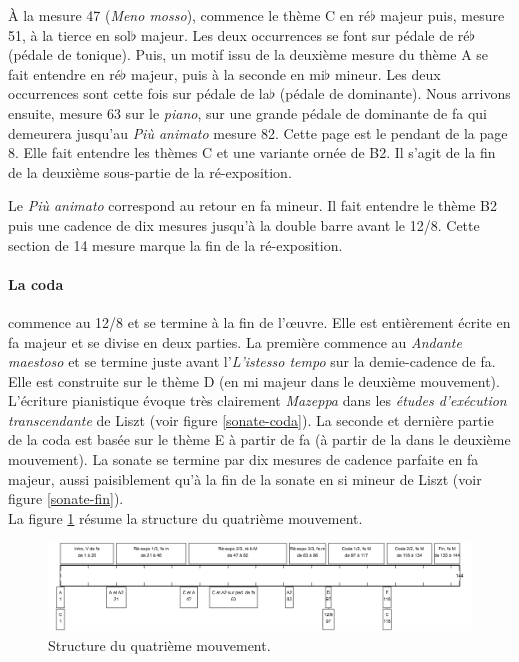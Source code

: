À la mesure 47 (\emph{Meno mosso}), commence le thème C en ré$\flat$ majeur puis, mesure 51, à la tierce en sol$\flat$ majeur. Les deux occurrences se font sur pédale de ré$\flat$ (pédale de tonique). Puis, un motif issu de la deuxième mesure du thème A se fait entendre en ré$\flat$ majeur, puis à la seconde en mi$\flat$ mineur. Les deux occurrences sont cette fois sur pédale de la$\flat$ (pédale de dominante). Nous arrivons ensuite, mesure 63 sur le \emph{piano}, sur une grande pédale de dominante de fa qui demeurera jusqu'au \emph{Più animato} mesure 82. Cette page est le pendant de la page 8. Elle fait entendre les thèmes C et une variante ornée de B2. Il s'agit de la fin de la deuxième sous-partie de la ré-exposition.

Le \emph{Più animato} correspond au retour en fa mineur. Il fait entendre le thème B2 puis une cadence de dix mesures jusqu'à la double barre avant le 12/8. Cette section de 14 mesure marque la fin de la ré-exposition.

\newpage

\paragraph{La coda} commence au 12/8 et se termine à la fin de l'œuvre. Elle est entièrement écrite en fa majeur et se divise en deux parties. La première commence au \emph{Andante maestoso} et se termine juste avant l'\emph{L'istesso tempo} sur la demie-cadence de fa. Elle est construite sur le thème D (en mi majeur dans le deuxième mouvement). L'écriture pianistique évoque très clairement \emph{Mazeppa} dans les \emph{études d'exécution transcendante} de Liszt (voir figure \ref{sonate-coda}). La seconde et dernière partie de la coda est basée sur le thème E à partir de fa (à partir de la dans le deuxième mouvement). La sonate se termine par dix mesures de cadence parfaite en fa majeur, aussi paisiblement qu'à la fin de la sonate en si mineur de Liszt (voir figure \ref{sonate-fin}).\\

La figure \ref{schema-4} résume la structure du quatrième mouvement.

\begin{figure}[!ht]
  \begin{bigcenter}
    \includegraphics[width=17.5cm, keepaspectratio]{frise-mvt4.png}
  \end{bigcenter}
  \caption{\label{schema-4}Structure du quatrième mouvement.}
\end{figure}

